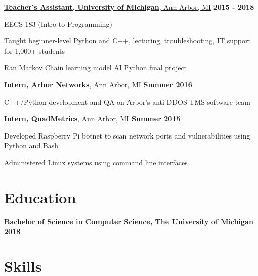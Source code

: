 \documentclass[margin,line]{resume}
\begin{document}
\begin{resume}
    \underline{\textbf{Teacher's Assistant, University of Michigan}, Ann Arbor, MI}
    \hfill \textbf{2015 - 2018} \\

    \begin{list2}
    \item EECS 183 (Intro to Programming)
    \item Taught beginner-level Python and C++, lecturing, troubleshooting, IT support for 1,000+ students
    \item Ran Markov Chain learning model AI Python final project
    \end{list2}

    \underline{\textbf{Intern, Arbor Networks}, Ann Arbor, MI}
    \hfill \textbf{Summer 2016} \\

    \begin{list2}
    \item C++/Python development and QA on Arbor's anti-DDOS TMS software team
    \end{list2}

    \underline{\textbf{Intern, QuadMetrics}, Ann Arbor, MI}
    \hfill \textbf{\hfill Summer 2015} \\

    \begin{list2}
    \item Developed Raspberry Pi botnet to scan network ports and vulnerabilities using Python and Bash
    \item Administered Linux systems using command line interfaces
    \end{list2}

    \section{\mysidestyle Education}
    \hfill

    \textbf{Bachelor of Science in Computer Science, The University of Michigan}
    \hfill \textbf{\hfill 2018}

    \section{\mysidestyle Skills}
    \hfill


\end{resume}
\end{document}
